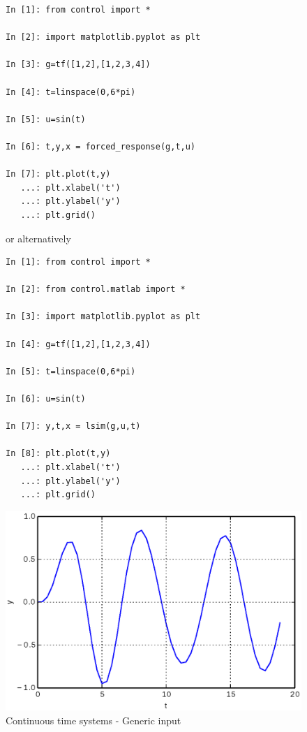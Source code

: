 \begin{figure}[htbp]  %
\begin{minipage}[t]{0.55\textwidth}
  \vspace{0pt}
\begin{lstlisting}[linewidth=7cm,xleftmargin=0cm]
In [1]: from control import *

In [2]: import matplotlib.pyplot as plt

In [3]: g=tf([1,2],[1,2,3,4])

In [4]: t=linspace(0,6*pi)

In [5]: u=sin(t)

In [6]: t,y,x = forced_response(g,t,u)

In [7]: plt.plot(t,y)
   ...: plt.xlabel('t')
   ...: plt.ylabel('y')
   ...: plt.grid()
\end{lstlisting}

or alternatively

\begin{lstlisting}[linewidth=7cm,xleftmargin=0cm]
In [1]: from control import *

In [2]: from control.matlab import *

In [3]: import matplotlib.pyplot as plt

In [4]: g=tf([1,2],[1,2,3,4])

In [5]: t=linspace(0,6*pi)

In [6]: u=sin(t)

In [7]: y,t,x = lsim(g,u,t)

In [8]: plt.plot(t,y)
   ...: plt.xlabel('t')
   ...: plt.ylabel('y')
   ...: plt.grid()
\end{lstlisting}
\end{minipage}%
\begin{minipage}[t]{0.5\textwidth}
  \vspace{0pt} \centering
  \includegraphics[width=\textwidth]{eps/lsim.eps}
\end{minipage}
\caption{Continuous time systems - Generic input}
\label{F5}
\end{figure}

